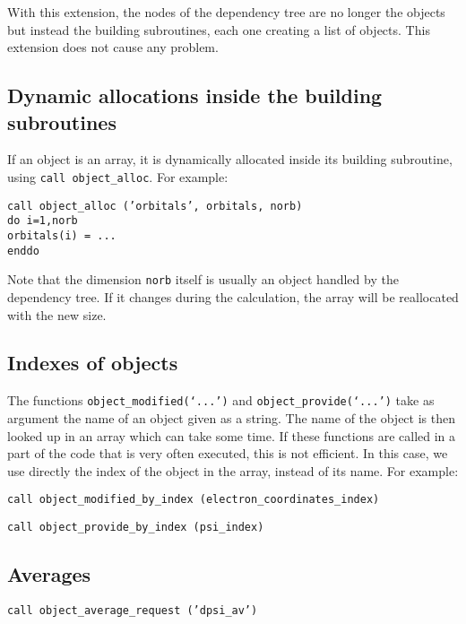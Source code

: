 \documentclass[a4paper,11pt]{article}
\begin{document}
\vspace{0.5cm}
With this extension, the nodes of the dependency tree are no longer the objects but instead the building subroutines, each one creating a list of objects. This extension does not cause any problem.

\subsection{Dynamic allocations inside the building subroutines}

If an object is an array, it is dynamically allocated inside its building subroutine, using {\tt call object\_alloc}. For example:

\vspace{0.5cm}
\noindent
{\tt call object\_alloc ('orbitals', orbitals, norb)\\
do i=1,norb\\
\phantom{xx} orbitals(i) = ...\\
enddo}

Note that the dimension {\tt norb} itself is usually an object handled by the dependency tree. If it changes during the calculation, the array will be reallocated with the new size.

\subsection{Indexes of objects}
The functions {\tt object\_modified(`...')} and {\tt object\_provide(`...')} take as argument the name of an object given as a string. The name of the object is then looked up in an array which can take some time. If these functions are called in a part of the code that is very often executed, this is not efficient. In this case, we use directly the index of the object in the array, instead of its name. For example:

\vspace{0.5cm}
\noindent
{\tt call object\_modified\_by\_index (electron\_coordinates\_index)}

\vspace{0.5cm}
\noindent
{\tt call object\_provide\_by\_index (psi\_index)}

\subsection{Averages}

\vspace{0.5cm}
\noindent
{\tt call object\_average\_request ('dpsi\_av')}
\end{document}

